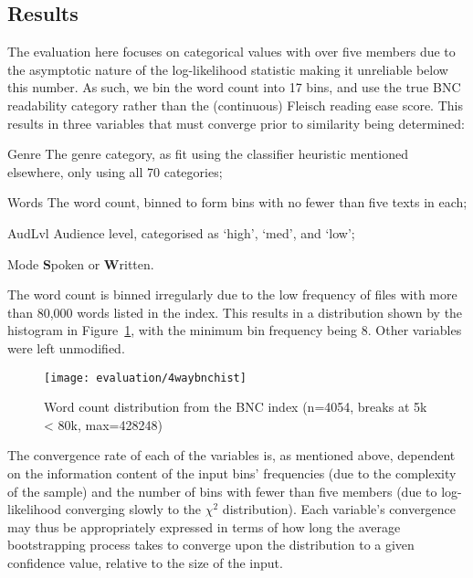 \subsection{Results}

The evaluation here focuses on categorical values with over five members due to the asymptotic nature of the log-likelihood statistic making it unreliable below this number.  As such, we bin the word count into 17 bins, and use the true BNC readability category rather than the (continuous) Fleisch reading ease score.  This results in three variables that must converge prior to similarity being determined:

\begin{itemizeTitle}
    \item[Genre]  The genre category, as fit using the classifier heuristic mentioned elsewhere, only using all 70 categories;
    \item[Words]  The word count, binned to form bins with no fewer than five texts in each;
    \item[AudLvl] Audience level, categorised as `high', `med', and `low';
    \item[Mode]   \textbf{S}poken or \textbf{W}ritten.
\end{itemizeTitle}

The word count is binned irregularly due to the low frequency of files with more than 80,000 words listed in the index.  This results in a distribution shown by the histogram in Figure~\ref{fig:evaluation:resampling:bncwordhist}, with the minimum bin frequency being 8.  Other variables were left unmodified.


\begin{figure}[Ht]
    \centering
    \texttt{[image: evaluation/4waybnchist]}
    \caption{Word count distribution from the BNC index (n=4054, breaks at 5k < 80k, max=428248)}
    \label{fig:evaluation:resampling:bncwordhist}
\end{figure}


The convergence rate of each of the variables is, as mentioned above, dependent on the information content of the input bins' frequencies (due to the complexity of the sample) and the number of bins with fewer than five members (due to log-likelihood converging slowly to the $\chi^2$ distribution).  Each variable's convergence may thus be appropriately expressed in terms of how long the average bootstrapping process takes to converge upon the distribution to a given confidence value, relative to the size of the input.


